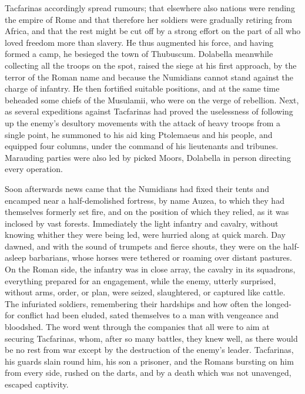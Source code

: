 Tacfarinas accordingly spread rumours; that elsewhere also nations were rending the empire of Rome and that therefore her soldiers were gradually retiring from Africa, and that the rest might be cut off by a strong effort on the part of all who loved freedom more than slavery. He thus augmented his force, and having formed a camp, he besieged the town of Thubuscum. Dolabella meanwhile collecting all the troops on the spot, raised the siege at his first approach, by the terror of the Roman name and because the Numidians cannot stand against the charge of infantry. He then fortified suitable positions, and at the same time beheaded some chiefs of the Musulamii, who were on the verge of rebellion. Next, as several expeditions against Tacfarinas had proved the uselessness of following up the enemy's desultory movements with the attack of heavy troops from a single point, he summoned to his aid king Ptolemaeus and his people, and equipped four columns, under the command of his lieutenants and tribunes. Marauding parties were also led by picked Moors, Dolabella in person directing every operation.


Soon afterwards news came that the Numidians had fixed their tents and encamped near a half-demolished fortress, by name Auzea, to which they had themselves formerly set fire, and on the position of which they relied, as it was inclosed by vast forests. Immediately the light infantry and cavalry, without knowing whither they were being led, were hurried along at quick march. Day dawned, and with the sound of trumpets and fierce shouts, they were on the half-asleep barbarians, whose horses were tethered or roaming over distant pastures. On the Roman side, the infantry was in close array, the cavalry in its squadrons, everything prepared for an engagement, while the enemy, utterly surprised, without arms, order, or plan, were seized, slaughtered, or captured like cattle. The infuriated soldiers, remembering their hardships and how often the longed-for conflict had been eluded, sated themselves to a man with vengeance and bloodshed. The word went through the companies that all were to aim at securing Tacfarinas, whom, after so many battles, they knew well, as there would be no rest from war except by the destruction of the enemy's leader. Tacfarinas, his guards slain round him, his son a prisoner, and the Romans bursting on him from every side, rushed on the darts, and by a death which was not unavenged, escaped captivity.


